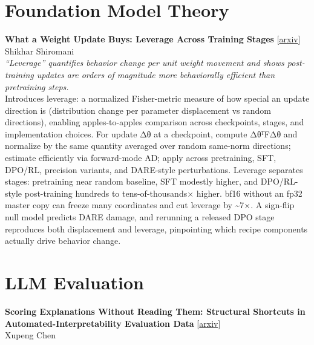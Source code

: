 \documentclass[12pt,letterpaper]{article}
\begin{document}
\medskip


\section*{Foundation Model Theory}

{\small\textbf{What a Weight Update Buys: Leverage Across Training Stages}} {\scriptsize[\href{https://arxiv.org/abs/2610.37719}{arxiv}]}\\
{\scriptsize Shikhar Shiromani}\\

{\small\textit{``Leverage'' quantifies behavior change per unit weight movement and shows post-training updates are orders of magnitude more behaviorally efficient than pretraining steps.}}\\[1pt]
{\footnotesize Introduces leverage: a normalized Fisher-metric measure of how special an update direction is (distribution change per parameter displacement vs random directions), enabling apples-to-apples comparison across checkpoints, stages, and implementation choices. For update Δθ at a checkpoint, compute ΔθᵀFΔθ and normalize by the same quantity averaged over random same-norm directions; estimate efficiently via forward-mode AD; apply across pretraining, SFT, DPO/RL, precision variants, and DARE-style perturbations. Leverage separates stages: pretraining near random baseline, SFT modestly higher, and DPO/RL-style post-training hundreds to tens-of-thousands× higher. bf16 without an fp32 master copy can freeze many coordinates and cut leverage by \textasciitilde{}7×. A sign-flip null model predicts DARE damage, and rerunning a released DPO stage reproduces both displacement and leverage, pinpointing which recipe components actually drive behavior change.}

\medskip


\section*{LLM Evaluation}

{\small\textbf{Scoring Explanations Without Reading Them: Structural Shortcuts in Automated-Interpretability Evaluation Data}} {\scriptsize[\href{https://arxiv.org/abs/2610.37676}{arxiv}]}\\
{\scriptsize Xupeng Chen}\\
\end{document}
